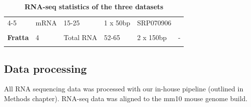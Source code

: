 \begin{longtable}[]{@{}llllll@{}}
\begin{minipage}[t]{0.14\columnwidth}
		{4-5}\strut
	\end{minipage} & \begin{minipage}[t]{0.14\columnwidth}\raggedright\strut
		{mRNA}\strut
	\end{minipage} & \begin{minipage}[t]{0.14\columnwidth}\raggedright\strut
		{15-25}\strut
	\end{minipage} & \begin{minipage}[t]{0.14\columnwidth}\raggedright\strut
		{1 x 50bp}\strut
	\end{minipage} & \begin{minipage}[t]{0.14\columnwidth}\raggedright\strut
		{SRP070906 }\strut
	\end{minipage}\tabularnewline \\
	\begin{minipage}[t]{0.14\columnwidth}\raggedright\strut
		{\textbf{Fratta} }\strut
	\end{minipage} & \begin{minipage}[t]{0.14\columnwidth}\raggedright\strut
		{4}\strut
	\end{minipage} & \begin{minipage}[t]{0.14\columnwidth}\raggedright\strut
		{Total RNA}\strut
	\end{minipage} & \begin{minipage}[t]{0.14\columnwidth}\raggedright\strut
		{52-65}\strut
	\end{minipage} & \begin{minipage}[t]{0.14\columnwidth}\raggedright\strut
		{2 x 150bp}\strut
	\end{minipage} & \begin{minipage}[t]{0.14\columnwidth}\raggedright\strut
		{-}\strut
	\end{minipage}\tabularnewline
	\caption[RNA-seq statistics of the three datasets]{\textbf{RNA-seq statistics of the three datasets}}
	\label{tab:fus_sequencing}
\end{longtable}

\subsection{Data processing}
All RNA sequencing data was processed with our in-house pipeline (outlined in Methods chapter). RNA-seq data was aligned to the mm10 mouse genome build.

